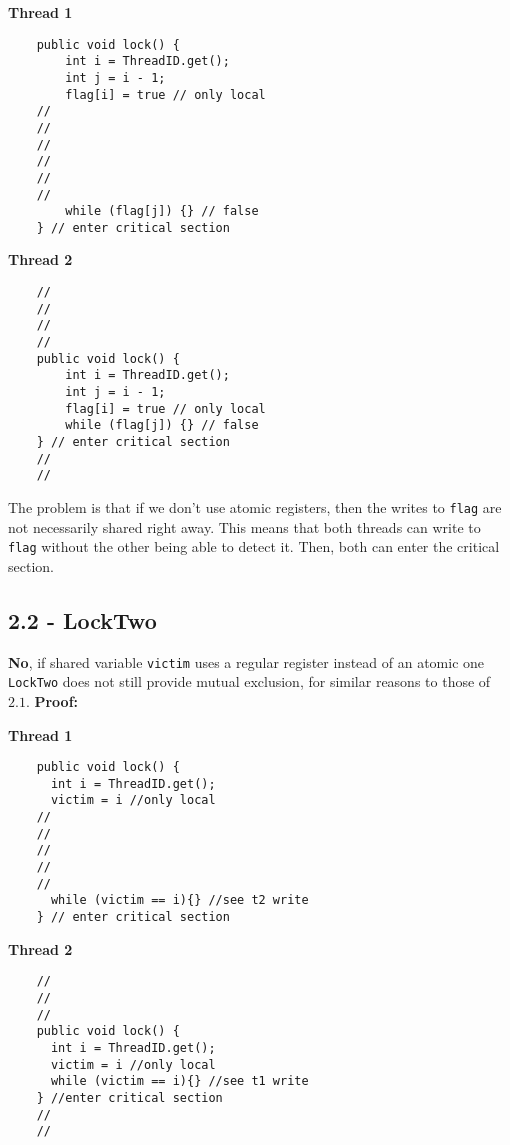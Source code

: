 \documentclass[11pt, letterpaper]{article}
\newcommand{\code}[1] { \texttt{#1} }
\begin{document}
\begin{figure*}[h!]
    \begin{minipage}{0.5\textwidth}
        \centering
        \textbf{Thread 1}
        \begin{verbatim}
    public void lock() {
        int i = ThreadID.get();
        int j = i - 1;
        flag[i] = true // only local
    //
    //
    //
    //
    //
    //
        while (flag[j]) {} // false
    } // enter critical section
        \end{verbatim}
    \end{minipage}
    \hspace{.5cm}
    \begin{minipage}{0.5\textwidth}
        \centering
        \textbf{Thread 2}
        \begin{verbatim}
    //
    //
    //
    //
    public void lock() {
        int i = ThreadID.get();
        int j = i - 1;
        flag[i] = true // only local
        while (flag[j]) {} // false
    } // enter critical section
    //
    //
        \end{verbatim}
    \end{minipage}
\end{figure*}

The problem is that if we don't use atomic registers, then the writes to \code{flag} are not necessarily shared right away. This means that both threads can write to \code{flag} without the other being able to detect it. Then, both can enter the critical section.

\subsection*{2.2 - LockTwo}
\label{sub:2_2_locktwo}

\textbf{No}, if shared variable \code{victim} uses a regular register instead of an atomic one \code{LockTwo} does not still provide mutual exclusion, for similar reasons to those of $2.1$. \textbf{Proof:}

\begin{figure*}[h!]
    \begin{minipage}{0.5\textwidth}
        \centering
        \textbf{Thread 1}
        \begin{verbatim}
    public void lock() {
      int i = ThreadID.get();
      victim = i //only local
    //
    //
    //
    //
    //
      while (victim == i){} //see t2 write
    } // enter critical section
        \end{verbatim}
    \end{minipage}
    \hspace{1cm}
    \begin{minipage}{0.5\textwidth}
        \centering
        \textbf{Thread 2}
        \begin{verbatim}
    //
    //
    //
    public void lock() {
      int i = ThreadID.get();
      victim = i //only local
      while (victim == i){} //see t1 write
    } //enter critical section
    //
    //
            \end{verbatim}
    \end{minipage}
\end{figure*}
\end{document}
